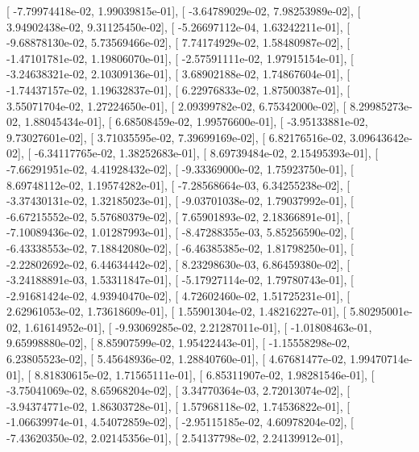 \documentclass{article}
\begin{document}
       [ -7.79974418e-02,   1.99039815e-01],
       [ -3.64789029e-02,   7.98253989e-02],
       [  3.94902438e-02,   9.31125450e-02],
       [ -5.26697112e-04,   1.63242211e-01],
       [ -9.68878130e-02,   5.73569466e-02],
       [  7.74174929e-02,   1.58480987e-02],
       [ -1.47101781e-02,   1.19806070e-01],
       [ -2.57591111e-02,   1.97915154e-01],
       [ -3.24638321e-02,   2.10309136e-01],
       [  3.68902188e-02,   1.74867604e-01],
       [ -1.74437157e-02,   1.19632837e-01],
       [  6.22976833e-02,   1.87500387e-01],
       [  3.55071704e-02,   1.27224650e-01],
       [  2.09399782e-02,   6.75342000e-02],
       [  8.29985273e-02,   1.88045434e-01],
       [  6.68508459e-02,   1.99576600e-01],
       [ -3.95133881e-02,   9.73027601e-02],
       [  3.71035595e-02,   7.39699169e-02],
       [  6.82176516e-02,   3.09643642e-02],
       [ -6.34117765e-02,   1.38252683e-01],
       [  8.69739484e-02,   2.15495393e-01],
       [ -7.66291951e-02,   4.41928432e-02],
       [ -9.33369000e-02,   1.75923750e-01],
       [  8.69748112e-02,   1.19574282e-01],
       [ -7.28568664e-03,   6.34255238e-02],
       [ -3.37430131e-02,   1.32185023e-01],
       [ -9.03701038e-02,   1.79037992e-01],
       [ -6.67215552e-02,   5.57680379e-02],
       [  7.65901893e-02,   2.18366891e-01],
       [ -7.10089436e-02,   1.01287993e-01],
       [ -8.47288355e-03,   5.85256590e-02],
       [ -6.43338553e-02,   7.18842080e-02],
       [ -6.46385385e-02,   1.81798250e-01],
       [ -2.22802692e-02,   6.44634442e-02],
       [  8.23298630e-03,   6.86459380e-02],
       [ -3.24188891e-03,   1.53311847e-01],
       [ -5.17927114e-02,   1.79780743e-01],
       [ -2.91681424e-02,   4.93940470e-02],
       [  4.72602460e-02,   1.51725231e-01],
       [  2.62961053e-02,   1.73618609e-01],
       [  1.55901304e-02,   1.48216227e-01],
       [  5.80295001e-02,   1.61614952e-01],
       [ -9.93069285e-02,   2.21287011e-01],
       [ -1.01808463e-01,   9.65998880e-02],
       [  8.85907599e-02,   1.95422443e-01],
       [ -1.15558298e-02,   6.23805523e-02],
       [  5.45648936e-02,   1.28840760e-01],
       [  4.67681477e-02,   1.99470714e-01],
       [  8.81830615e-02,   1.71565111e-01],
       [  6.85311907e-02,   1.98281546e-01],
       [ -3.75041069e-02,   8.65968204e-02],
       [  3.34770364e-03,   2.72013074e-02],
       [ -3.94374771e-02,   1.86303728e-01],
       [  1.57968118e-02,   1.74536822e-01],
       [ -1.06639974e-01,   4.54072859e-02],
       [ -2.95115185e-02,   4.60978204e-02],
       [ -7.43620350e-02,   2.02145356e-01],
       [  2.54137798e-02,   2.24139912e-01],
\end{document}
